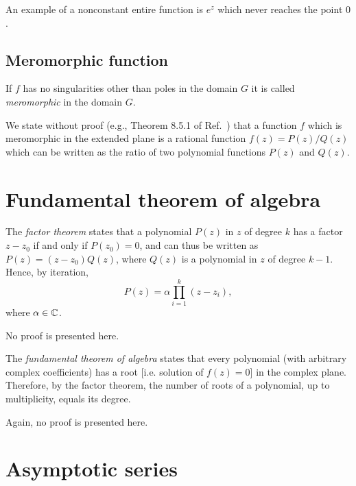 An example of a nonconstant entire function is $e^z$ which never reaches the point $0$.

\subsection{Meromorphic function}

If $f$ has no singularities other than poles in the domain
$G$ it is called {\em meromorphic} in the domain $G$.


We state without proof (e.g., Theorem 8.5.1 of Ref.~\cite[-10mm]{Hille62})
that a function $f$ which is meromorphic in the extended plane
is a rational function $f(z)=P(z)/Q(z)$
which can be written as the ratio of two polynomial functions
$P(z)$ and $Q(z)$.



\section{Fundamental theorem of algebra}

The {\em factor theorem} states that a polynomial $P(z)$  in $z$  of degree $k$
has a factor $z-z_0$ if and only if $P (z_0)=0$, and can thus be written as $P (z)= (z-z_0)Q(z)$,
where $Q(z)$ is a polynomial  in $z$  of degree $k-1$.
Hence, by iteration,
\begin{equation}
P(z)= \alpha \prod_{i=1}^k \left(z-z_i\right),
\end{equation}
where $\alpha \in {\Bbb C}$.

No proof is presented here.

The {\em fundamental theorem of algebra} states that
every polynomial (with arbitrary complex coefficients) has a root [i.e. solution of $f(z)=0$] in the complex plane.
Therefore, by the factor theorem, the number of roots of a polynomial, up to multiplicity, equals its degree.

Again, no proof
is presented here.

\section{Asymptotic series}
\label{2019-mm-ch-ca-Ritt}

